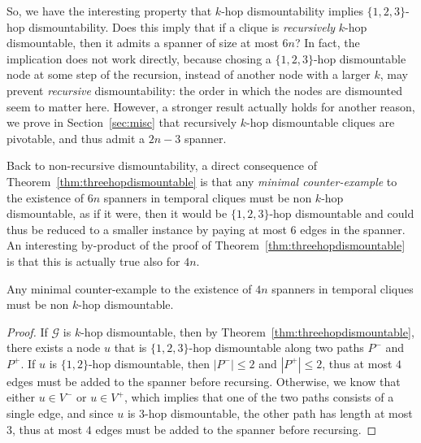 \documentclass[USenglish, a4paper, thm-restate,numberwithinsect, cleveref]{lipics-v2021}
\newcommand{\G}{\ensuremath{\mathcal{G}}\xspace}
\begin{document}
So, we have the interesting property that $k$-hop dismountability implies $\{1,2,3\}$-hop dismountability. Does this imply that if a clique is \emph{recursively} $k$-hop dismountable, then it admits a spanner of size at most $6n$? In fact, the implication does not work directly, because chosing a $\{1,2,3\}$-hop dismountable node at some step of the recursion, instead of another node with a larger $k$, may prevent \emph{recursive} dismountability: the order in which the nodes are dismounted seem to matter here. However, a stronger result actually holds for another reason, we prove in Section~\ref{sec:misc} that recursively $k$-hop dismountable cliques are pivotable, and thus admit a $2n-3$ spanner.

Back to non-recursive dismountability, a direct consequence of Theorem~\ref{thm:threehopdismountable} is that any \emph{minimal counter-example} to the existence of $6n$ spanners in temporal cliques must be non $k$-hop dismountable, as if it were, then it would be $\{1,2,3\}$-hop dismountable and could thus be reduced to a smaller instance by paying at most $6$ edges in the spanner. An interesting by-product of the proof of Theorem~\ref{thm:threehopdismountable} is that this is actually true also for $4n$.

\begin{corollary}\label{cor:4n-spanner}
  Any minimal counter-example to the existence of $4n$ spanners in temporal cliques must be non $k$-hop dismountable.
\end{corollary}

\begin{proof}
  If $\G$ is $k$-hop dismountable, then by Theorem~\ref{thm:threehopdismountable}, there exists a node $u$ that is $\{1,2,3\}$-hop dismountable along two paths $P^-$ and $P^+$.
  If $u$ is $\{1,2\}$-hop dismountable, then $|P^-| \leq 2$ and $|P^+| \leq 2$, thus at most $4$ edges must be added to the spanner before recursing. Otherwise, we know that either $u \in V^-$ or $u \in V^+$, which implies that one of the two paths consists of a single edge, and since $u$ is $3$-hop dismountable, the other path has length at most $3$, thus at most $4$ edges must be added to the spanner before recursing.
\end{proof}
\end{document}
